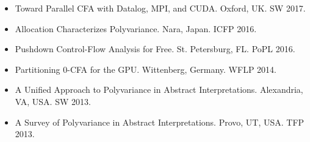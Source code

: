 \begin{itemize}
\itemsep=0.1cm
\item Toward Parallel CFA with Datalog, MPI, and CUDA. Oxford, UK. SW 2017.
\item Allocation Characterizes Polyvariance. Nara, Japan. ICFP 2016.
\item Pushdown Control-Flow Analysis for Free. St. Petersburg, FL. PoPL 2016.
\item Partitioning 0-CFA for the GPU. Wittenberg, Germany. WFLP 2014.
\item A Unified Approach to Polyvariance in Abstract Interpretations. Alexandria, VA, USA. SW 2013.
\item A Survey of Polyvariance in Abstract Interpretations. Provo, UT, USA. TFP 2013.
\end{itemize}
